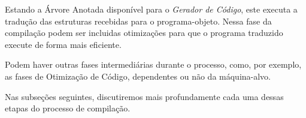 Estando a Árvore Anotada disponível para o \emph{Gerador de Código}, este
executa a tradução das estruturas recebidas para o programa-objeto. Nessa fase
da compilação podem ser incluidas otimizações para que o programa traduzido
execute de forma mais eficiente.

Podem haver outras fases intermediárias durante o processo, como, por exemplo,
as fases de Otimização de Código, dependentes ou não da máquina-alvo.

Nas subseções seguintes, discutiremos mais profundamente cada uma dessas etapas
do processo de compilação.





